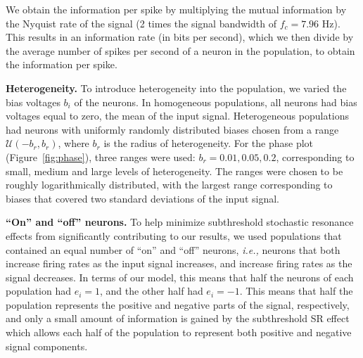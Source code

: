 \documentclass[letterpaper,11pt]{article}
\begin{document}
We obtain the information per spike by multiplying the mutual information by the Nyquist rate of the signal (2 times the signal bandwidth of $f_c = 7.96$ Hz). This results in an information rate (in bits per second), which we then divide by the average number of spikes per second of a neuron in the population, to obtain the information per spike.

\textbf{Heterogeneity.} To introduce heterogeneity into the population, we varied the bias voltages $b_i$ of the neurons. In homogeneous populations, all neurons had bias voltages equal to zero, the mean of the input signal. Heterogeneous populations had neurons with uniformly randomly distributed biases chosen from a range $\mathcal{U}(-b_r, b_r)$, where $b_r$ is the radius of heterogeneity. For the phase plot (Figure~\ref{fig:phase}), three ranges were used: $b_r = 0.01, 0.05, 0.2$, corresponding to small, medium and large levels of heterogeneity. The ranges were chosen to be roughly logarithmically distributed, with the largest range corresponding to biases that covered two standard deviations of the input signal.

\textbf{``On'' and ``off'' neurons.} To help minimize subthreshold stochastic resonance effects from significantly contributing to our results, we used populations that contained an equal number of ``on'' and ``off'' neurons, \emph{i.e.,} neurons that both increase firing rates as the input signal increases, and increase firing rates as the signal decreases. In terms of our model, this means that half the neurons of each population had $e_i = 1$, and the other half had $e_i = -1$. This means that half the population represents the positive and negative parts of the signal, respectively, and only a small amount of information is gained by the subthreshold SR effect which allows each half of the population to represent both positive and negative signal components.
\end{document}
